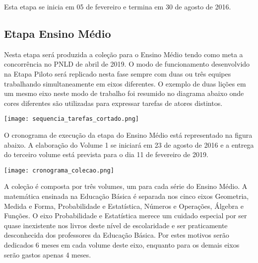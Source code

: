 \documentclass[10 pt]{article}
\begin{document}
Esta etapa se inicia em 05 de fevereiro e termina em 30 de agosto de 2016.

\subsection{Etapa Ensino Médio}

Nesta etapa será produzida a coleção para o Ensino Médio tendo como meta a concorrência no PNLD de abril de 2019.
O modo de funcionamento desenvolvido na Etapa Piloto será replicado nesta fase sempre com duas ou três equipes trabalhando simultaneamente em eixos diferentes.
O exemplo de duas lições em um mesmo eixo neste modo de trabalho foi resumido no diagrama abaixo onde cores diferentes são utilizadas para expressar tarefas de atores distintos.

\noindent\texttt{[image: sequencia\_tarefas\_cortado.png]}

O cronograma de execução da etapa do Ensino Médio está representado na figura abaixo. A elaboração do Volume 1 se iniciará em 23 de agosto de 2016 e a entrega do terceiro volume está prevista para o dia 11 de fevereiro de 2019.

\noindent\texttt{[image: cronograma\_colecao.png]}
\vspace{0.2 cm}

A coleção é composta por três volumes, um para cada série do Ensino Médio. A matemática ensinada na Educação Básica é separada nos cinco eixos  Geometria, Medida e Forma, Probabilidade e Estatística, Números e Operações, Álgebra e Funções. O eixo Probabilidade e Estatística merece um cuidado especial por ser quase inexistente nos livros deste nível de escolaridade e ser praticamente desconhecida dos professores da Educação Básica. Por estes motivos serão dedicados 6 meses em cada volume deste eixo, enquanto para os demais eixos serão gastos apenas 4 meses.
\clearpage

\vspace{0.2 cm}
\end{document}
